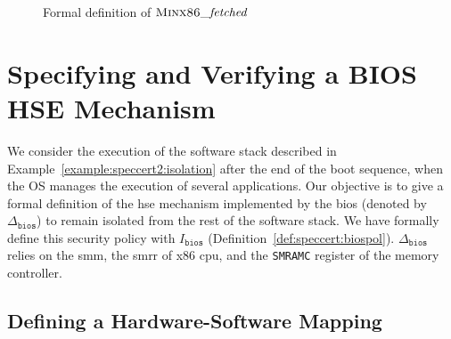 \begin{figure}
  \begin{prooftree}
  \end{prooftree}

  \begin{prooftree}
  \end{prooftree}

  \caption{Formal definition of \( \textsc{Minx86}\func{\_fetched} \)}
  \label{fig:speccert2:fetchedformal}
\end{figure}

\section{Specifying and Verifying a BIOS HSE Mechanism}
\label{sec:speccert2:verif}

We consider the execution of the software stack described in
Example~\ref{example:speccert2:isolation} after the end of the boot sequence,
when the OS manages the execution of several applications.
%
Our objective is to give a formal definition of the \ac{hse} mechanism
implemented by the \ac{bios} (denoted by \( \Delta_{\mathtt{bios}} \)) to remain
isolated from the rest of the software stack.
%
We have formally define this security policy with $I_{\mathtt{bios}}$
(Definition~\ref{def:speccert:biospol}).
%
\( \Delta_{\mathtt{bios}} \) relies on the \ac{smm}, the \ac{smrr} of x86
\ac{cpu}, and the \texttt{SMRAMC} register of the memory controller.
%

\subsection{Defining a Hardware-Software Mapping}

